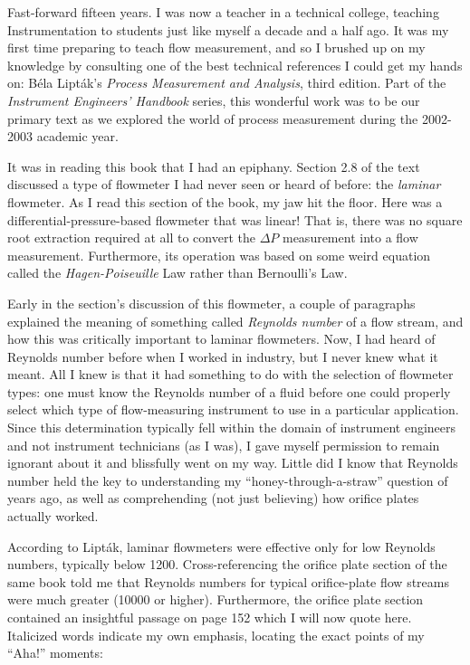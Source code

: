 \vskip 20pt

Fast-forward fifteen years.  I was now a teacher in a technical college, teaching Instrumentation to students just like myself a decade and a half ago.  It was my first time preparing to teach flow measurement, and so I brushed up on my knowledge by consulting one of the best technical references I could get my hands on: B\'ela Lipt\'ak's \textit{Process Measurement and Analysis}, third edition.  Part of the \textit{Instrument Engineers' Handbook} series, this wonderful work was to be our primary text as we explored the world of process measurement during the 2002-2003 academic year.  

It was in reading this book that I had an epiphany.  Section 2.8 of the text discussed a type of flowmeter I had never seen or heard of before: the \textit{laminar} flowmeter.  As I read this section of the book, my jaw hit the floor.  Here was a differential-pressure-based flowmeter that was linear!  That is, there was no square root extraction required at all to convert the $\Delta P$ measurement into a flow measurement.  Furthermore, its operation was based on some weird equation called the \textit{Hagen-Poiseuille} Law rather than Bernoulli's Law.

Early in the section's discussion of this flowmeter, a couple of paragraphs explained the meaning of something called \textit{Reynolds number} of a flow stream, and how this was critically important to laminar flowmeters.  Now, I had heard of Reynolds number before when I worked in industry, but I never knew what it meant.  All I knew is that it had something to do with the selection of flowmeter types: one must know the Reynolds number of a fluid before one could properly select which type of flow-measuring instrument to use in a particular application.  Since this determination typically fell within the domain of instrument engineers and not instrument technicians (as I was), I gave myself permission to remain ignorant about it and blissfully went on my way.  Little did I know that Reynolds number held the key to understanding my ``honey-through-a-straw'' question of years ago, as well as comprehending (not just believing) how orifice plates actually worked.

According to Lipt\'ak, laminar flowmeters were effective only for low Reynolds numbers, typically below 1200.  Cross-referencing the orifice plate section of the same book told me that Reynolds numbers for typical orifice-plate flow streams were much greater (10000 or higher).  Furthermore, the orifice plate section contained an insightful passage on page 152 which I will now quote here.  Italicized words indicate my own emphasis, locating the exact points of my ``Aha!'' moments:

